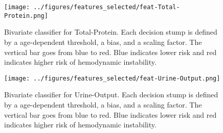 \documentclass[
   technote
]{phildoc}
\newcommand{\mx}[1]{{\color{green}{MX: #1}}}
\begin{document}
\begin{figure}[h!]
	\centering
	\texttt{[image: ../figures/features\_selected/feat-Total-Protein.png]}
	\caption{Bivariate classifier for Total-Protein. Each decision stump is defined by a age-dependent threshold, a bias, and a scaling factor. The vertical bar goes from blue to red. Blue indicates lower risk and red indicates higher risk of hemodynamic instability.}      
\end{figure}

\clearpage

\begin{figure}[h!]
	\centering
	\texttt{[image: ../figures/features\_selected/feat-Urine-Output.png]}
	\caption{Bivariate classifier for Urine-Output. Each decision stump is defined by a age-dependent threshold, a bias, and a scaling factor. The vertical bar goes from blue to red. Blue indicates lower risk and red indicates higher risk of hemodynamic instability.}      
\end{figure}



\mx{you do not report performance using PPV.  it will be good to  include that in future version(s) of this report or manuscript for submission.}
\end{document}
